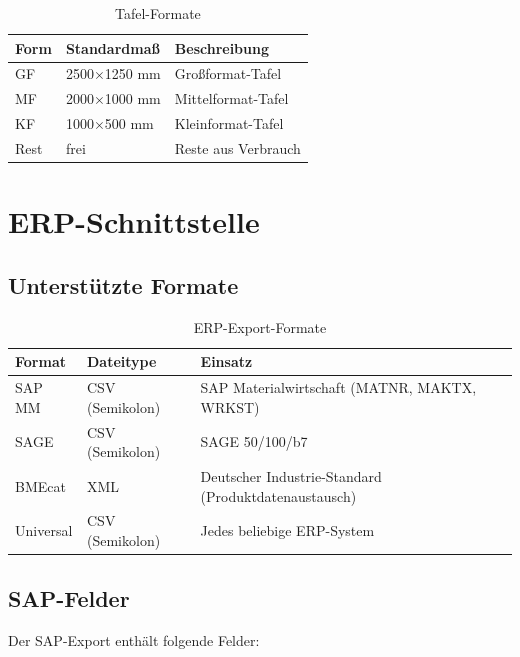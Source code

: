 \documentclass[a4paper,12pt]{article}
\begin{document}
\begin{table}[h]
\centering
\begin{tabular}{l l l}
\toprule
\textbf{Form} & \textbf{Standardmaß} & \textbf{Beschreibung} \\
\midrule
GF & 2500$\times$1250 mm & Großformat-Tafel \\
MF & 2000$\times$1000 mm & Mittelformat-Tafel \\
KF & 1000$\times$500 mm & Kleinformat-Tafel \\
Rest & frei & Reste aus Verbrauch \\
\bottomrule
\end{tabular}
\caption{Tafel-Formate}
\end{table}

\section{ERP-Schnittstelle}

\subsection{Unterstützte Formate}

\begin{table}[h]
\centering
\begin{tabularx}{\textwidth}{l l X}
\toprule
\textbf{Format} & \textbf{Dateitype} & \textbf{Einsatz} \\
\midrule
SAP MM & CSV (Semikolon) & SAP Materialwirtschaft (MATNR, MAKTX, WRKST) \\
SAGE & CSV (Semikolon) & SAGE 50/100/b7 \\
BMEcat & XML & Deutscher Industrie-Standard (Produktdatenaustausch) \\
Universal & CSV (Semikolon) & Jedes beliebige ERP-System \\
\bottomrule
\end{tabularx}
\caption{ERP-Export-Formate}
\end{table}

\subsection{SAP-Felder}

Der SAP-Export enthält folgende Felder:
\end{document}
